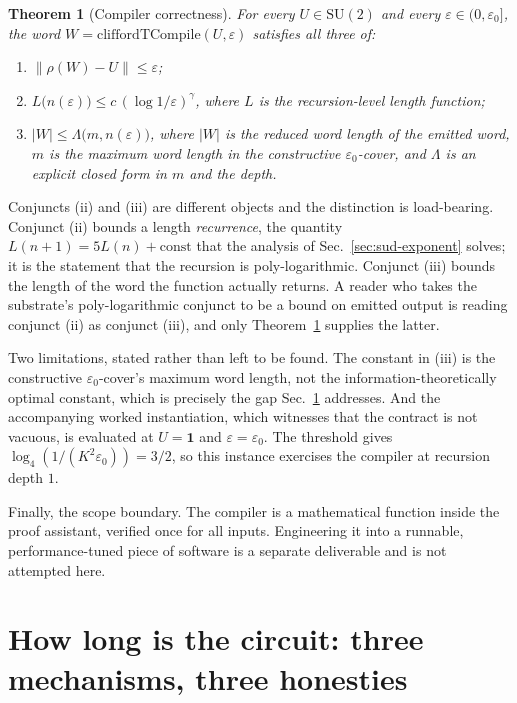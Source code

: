 \documentclass[aps,pra,reprint,nofootinbib,superscriptaddress]{revtex4-2}
\newcommand{\su}[1]{\mathrm{SU}(#1)}
\newcommand{\opn}[1]{\lVert #1 \rVert}
\theoremstyle{plain}
\newtheorem{theorem}{Theorem}
\theoremstyle{definition}
\begin{document}
\begin{theorem}[Compiler correctness]
\label{thm:compile}
For every $U \in \su 2$ and every $\varepsilon \in (0,\varepsilon_0]$, the word
$W = \mathrm{cliffordTCompile}(U,\varepsilon)$ satisfies all three of:
\begin{enumerate}
\item $\opn{\rho(W) - U} \le \varepsilon$;
\item $L\big(n(\varepsilon)\big) \le c\,(\log 1/\varepsilon)^{\gamma}$, where
$L$ is the recursion-level length function;
\item $\lvert W\rvert \le \Lambda\big(m, n(\varepsilon)\big)$, where $\lvert
W\rvert$ is the reduced word length of the emitted word, $m$ is the maximum
word length in the constructive $\varepsilon_0$-cover, and $\Lambda$ is an
explicit closed form in $m$ and the depth.
\end{enumerate}
\end{theorem}

Conjuncts (ii) and (iii) are different objects and the distinction is
load-bearing. Conjunct (ii) bounds a length \emph{recurrence}, the quantity
$L(n+1) = 5L(n) + \mathrm{const}$ that the analysis of
Sec.~\ref{sec:sud-exponent} solves; it is the statement that the recursion is
poly-logarithmic. Conjunct (iii) bounds the length of the word the function
actually returns. A reader who takes the substrate's poly-logarithmic conjunct
to be a bound on emitted output is reading conjunct (ii) as conjunct (iii), and
only Theorem~\ref{thm:compile} supplies the latter.

Two limitations, stated rather than left to be found. The constant in (iii) is
the constructive $\varepsilon_0$-cover's maximum word length, not the
information-theoretically optimal constant, which is precisely the gap
Sec.~\ref{sec:length} addresses. And the accompanying worked instantiation,
which witnesses that the contract is not vacuous, is evaluated at $U = \mathbf 1$
and $\varepsilon = \varepsilon_0$. The threshold gives
$\log_4(1/(K^2\varepsilon_0)) = 3/2$, so this instance exercises the
compiler at recursion depth $1$.

Finally, the scope boundary. The compiler is a mathematical function inside the
proof assistant, verified once for all inputs. Engineering it into a runnable,
performance-tuned piece of software is a separate deliverable and is not
attempted here.

\section{How long is the circuit: three mechanisms, three honesties}
\label{sec:length}
\end{document}
